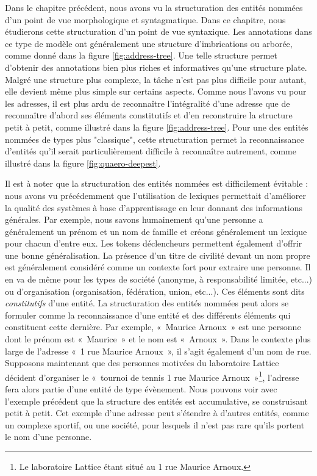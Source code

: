 \documentclass[PhD-Yoann-Dupont.tex]{subfiles}
\begin{document}
Dans le chapitre précédent, nous avons vu la structuration des entités nommées d'un point de vue morphologique et syntagmatique. Dans ce chapitre, nous étudierons cette structuration d'un point de vue syntaxique. Les annotations dans ce type de modèle ont généralement une structure d'imbrications ou arborée, comme donné dans la figure \ref{fig:address-tree}. Une telle structure permet d'obtenir des annotations bien plus riches et informatives qu'une structure plate. Malgré une structure plus complexe, la tâche n'est pas plus difficile pour autant, elle devient même plus simple sur certains aspects. Comme nous l'avons vu pour les adresses, il est plus ardu de reconnaître l'intégralité d'une adresse que de reconnaître d'abord ses éléments constitutifs et d'en reconstruire la structure petit à petit, comme illustré dans la figure \ref{fig:address-tree}. Pour une des entités nommées de types plus "classique", cette structuration permet la reconnaissance d'entités qu'il serait particulièrement difficile à reconnaître autrement, comme illustré dans la figure \ref{fig:quaero-deepest}.

Il est à noter que la structuration des entités nommées est difficilement évitable : nous avons vu précédemment que l'utilisation de lexiques permettait d'améliorer la qualité des systèmes à base d'apprentissage en leur donnant des informations générales. Par exemple, nous savons humainement qu'une personne a généralement un prénom et un nom de famille et créons généralement un lexique pour chacun d'entre eux. Les tokens déclencheurs permettent également d'offrir une bonne généralisation. La présence d'un titre de civilité devant un nom propre est généralement considéré comme un contexte fort pour extraire une personne. Il en va de même pour les types de société (anonyme, à responsabilité limitée, etc...) ou d'organisation (organisation, fédération, union, etc...). Ces éléments sont dits \emph{constitutifs} d'une entité. La structuration des entités nommées peut alors se formuler comme la reconnaissance d'une entité et des différents éléments qui constituent cette dernière. Par exemple, «\ Maurice Arnoux\ » est une personne dont le prénom est «\ Maurice\ » et le nom est «\ Arnoux\ ». Dans le contexte plus large de l'adresse «\ 1 rue Maurice Arnoux\ », il s'agit également d'un nom de rue. Supposons maintenant que des personnes motivées du laboratoire Lattice décident d'organiser le «\ tournoi de tennis 1 rue Maurice Arnoux\ »\footnote{Le laboratoire Lattice étant situé au 1 rue Maurice Arnoux.}, l'adresse fera alors partie d'une entité de type évènement. Nous pouvons voir avec l'exemple précédent que la structure des entités est accumulative, se construisant petit à petit. Cet exemple d'une adresse peut s'étendre à d'autres entités, comme un complexe sportif, ou une société, pour lesquels il n'est pas rare qu'ils portent le nom d'une personne.
\end{document}
